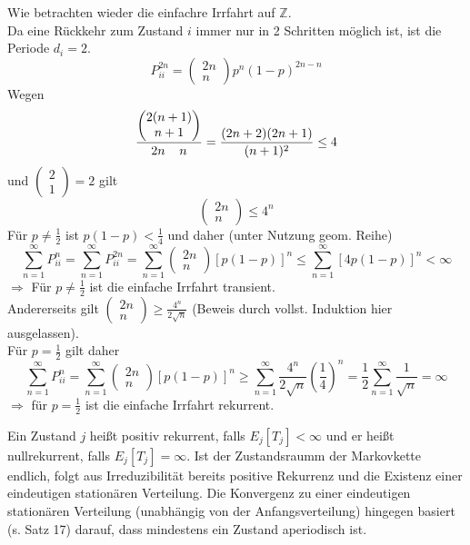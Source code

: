 \documentclass[a4paper,12pt]{article}
\begin{document}
\begin{tcolorbox}[breakable, colframe=blue, colback=white, title=Beispiel 16]
Wie betrachten wieder die einfachre Irrfahrt auf $\mathbb{Z}$.\\
Da eine Rückkehr zum Zustand $i$ immer nur in 2 Schritten möglich ist, ist die Periode $d_i = 2$.\\
$$
P_{ii}^{2n} = \begin{pmatrix}2n \\ n \end{pmatrix}p^n(1-p)^{2n - n}
$$
Wegen
$$
\frac{
\begin{pmatrix} 2(n+1) \\ n+1 \end{pmatrix}
}{
2n \\n
} = \frac{(2n+2)(2n+1)}{(n+1)^2} \leq 4 
$$
und $\begin{pmatrix}2 \\ 1 \end{pmatrix} = 2$ gilt
$$
\begin{pmatrix}2n \\ n \end{pmatrix} \leq 4^n
$$
Für $p \neq \frac{1}{2}$ ist $p(1-p)<\frac{1}{4}$ und daher (unter Nutzung geom. Reihe)
$$
\sum_{n=1}^{\infty}P_{ii}^n = \sum_{n=1}^{\infty} P_{ii}^{2n} = \sum_{n=1}^{\infty} 
\begin{pmatrix}2n \\ n \end{pmatrix} [p(1-p)]^n
\leq \sum_{n=1}^{\infty}[4p(1-p)]^n
< \infty
$$
$\Rightarrow$ Für $p \neq \frac{1}{2}$ ist die einfache Irrfahrt transient.\\


Andererseits gilt $\begin{pmatrix}2n \\ n \end{pmatrix} \geq \frac{4^n}{2 \sqrt{n}}$ (Beweis durch vollst. Induktion hier ausgelassen).\\
Für $p = \frac{1}{2}$ gilt daher
$$
\sum_{n=1}^{	\infty} P_{ii}^n = \sum_{n=1}^{\infty} \begin{pmatrix}2n \\ n \end{pmatrix} [p(1-p)]^n \geq \sum_{n=1}^{\infty}
\frac{4^n}{2 \sqrt{n}}\left(\frac{1}{4}\right)^n = \frac{1}{2}\sum_{n=1}^{\infty}\frac{1}{\sqrt{n}} = \infty
$$
$\Rightarrow$ für $p = \frac{1}{2}$ ist die einfache Irrfahrt rekurrent. 
\end{tcolorbox}

Ein Zustand $j$ heißt positiv rekurrent, falls $E_j[T_j] < \infty$ und er heißt nullrekurrent, falls
$E_j[T_j] = \infty$. Ist der Zustandsraumm der Markovkette endlich, folgt aus 
Irreduzibilität bereits positive Rekurrenz und die Existenz einer eindeutigen stationären Verteilung.
Die Konvergenz zu einer eindeutigen stationären Verteilung (unabhängig von der Anfangsverteilung) hingegen basiert (s. Satz 17) darauf,
dass mindestens ein Zustand aperiodisch ist. 
\end{document}
